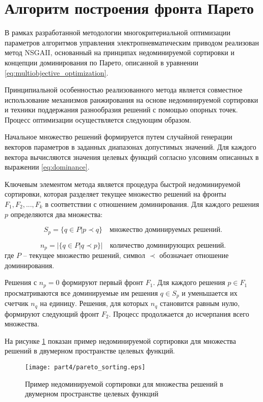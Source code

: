 \section{Алгоритм построения фронта Парето}\label{sec:ch4/sec5}

В рамках разработанной методологии многокритериальной оптимизации параметров алгоритмов управления электропневматическим приводом реализован
метод NSGAII, основанный на принципах недоминируемой сортировки и концепции доминирования по Парето, описанной в уравнении \ref{eq:multiobjective_optimization}.

Принципиальной особенностью реализованного метода является совместное использование механизмов ранжирования на основе недоминируемой
сортировки и техники поддержания разнообразия решений с помощью опорных точек. Процесс оптимизации осуществляется следующим образом.

Начальное множество решений формируется путем случайной генерации векторов
параметров в заданных диапазонах допустимых значений. Для каждого 
вектора вычисляются значения целевых функций согласно улсовиям описанных в выражении \ref{eq:dominance}. 

Ключевым элементом метода является процедура быстрой недоминируемой сортировки, которая разделяет текущее множество решений
на фронты $F_1, F_2, ..., F_k$ в соответствии с отношением доминирования. Для каждого решения $p$ определяются два множества:

\begin{equation}
S_p = \{q \in P | p \prec q\} \quad \text{множество доминируемых решений}.
\end{equation}

\begin{equation}
n_p = |\{q \in P | q \prec p\}| \quad \text{количество доминирующих решений}.
\end{equation}
где $P$ -- текущее множество решений, символ $\prec$ обозначает отношение доминирования.

Решения с $n_p = 0$ формируют первый фронт $F_1$. Для каждого решения $p \in F_1$ просматриваются
все доминируемые им решения $q \in S_p$ и уменьшается их счетчик $n_q$ на единицу.
Решения, для которых $n_q$ становится равным нулю, формируют следующий
фронт $F_2$. Процесс продолжается до исчерпания всего множества.

На рисунке \ref{fig:pareto_sorting} показан пример недоминируемой сортировки для множества решений в двумерном пространстве целевых функций.

\begin{figure}[ht]
    \centering
    \texttt{[image: part4/pareto\_sorting.eps]}
    \caption{Пример недоминируемой сортировки для множества решений в двумерном пространстве целевых функций}
    \label{fig:pareto_sorting}
\end{figure}

